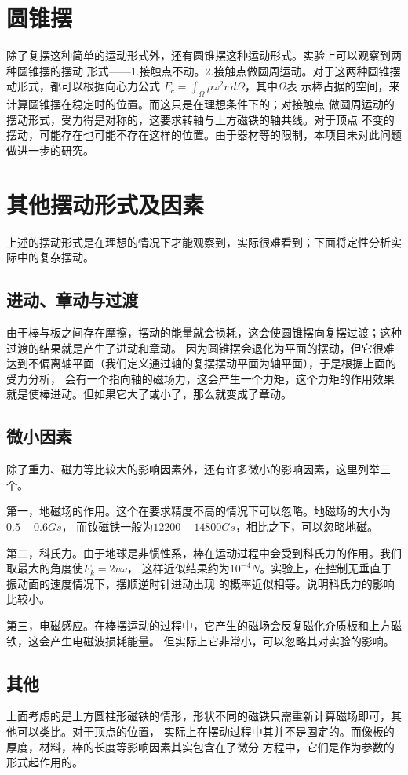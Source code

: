 \documentclass[AutoFakeBold]{LZUThesis}
\begin{document}
\section{圆锥摆}

除了复摆这种简单的运动形式外，还有圆锥摆这种运动形式。实验上可以观察到两种圆锥摆的摆动
形式——1.接触点不动。2.接触点做圆周运动。对于这两种圆锥摆动形式，都可以根据向心力公式
$F_c = \int_{\Omega} \rho\omega^2r \,d\Omega$，其中$\Omega$表
示棒占据的空间，来计算圆锥摆在稳定时的位置。而这只是在理想条件下的；对接触点
做圆周运动的摆动形式，受力得是对称的，这要求转轴与上方磁铁的轴共线。对于顶点
不变的摆动，可能存在也可能不存在这样的位置。由于器材等的限制，本项目未对此问题做进一步的研究。

\section{其他摆动形式及因素}
上述的摆动形式是在理想的情况下才能观察到，实际很难看到；下面将定性分析实际中的复杂摆动。

\subsection{进动、章动与过渡}
由于棒与板之间存在摩擦，摆动的能量就会损耗，这会使圆锥摆向复摆过渡；这种过渡的结果就是产生了进动和章动。
因为圆锥摆会退化为平面的摆动，但它很难达到不偏离轴平面（我们定义通过轴的复摆摆动平面为轴平面），于是根据上面的受力分析，
会有一个指向轴的磁场力，这会产生一个力矩，这个力矩的作用效果就是使棒进动。但如果它大了或小了，那么就变成了章动。

\subsection{微小因素}
除了重力、磁力等比较大的影响因素外，还有许多微小的影响因素，这里列举三个。

第一，地磁场的作用。这个在要求精度不高的情况下可以忽略。地磁场的大小为$0.5-0.6Gs$，
而钕磁铁一般为$12200-14800Gs$，相比之下，可以忽略地磁。

第二，科氏力。由于地球是非惯性系，棒在运动过程中会受到科氏力的作用。我们取最大的角度使$F_k = 2v\omega$，
这样近似结果约为$10^{-4}N$。实验上，在控制无垂直于振动面的速度情况下，摆顺逆时针进动出现
的概率近似相等。说明科氏力的影响比较小。

第三，电磁感应。在棒摆运动的过程中，它产生的磁场会反复磁化介质板和上方磁铁，这会产生电磁波损耗能量。
但实际上它非常小，可以忽略其对实验的影响。

\subsection{其他}
上面考虑的是上方圆柱形磁铁的情形，形状不同的磁铁只需重新计算磁场即可，其他可以类比。对于顶点的位置，
实际上在摆动过程中其并不是固定的。而像板的厚度，材料，棒的长度等影响因素其实包含在了微分
方程中，它们是作为参数的形式起作用的。
\end{document}

